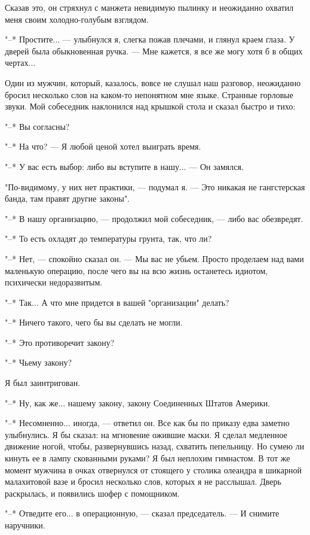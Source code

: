 Сказав это, он  стряхнул  с  манжета  невидимую  пылинку  и  неожиданно
охватил меня своим холодно-голубым взглядом.

"--* Простите... --- улыбнулся я,  слегка  пожав  плечами,  и  глянул  краем
глаза. У дверей была обыкновенная ручка. --- Мне кажется, я все же могу хотя
б в общих чертах...

Один из мужчин,  который,  казалось,  вовсе  не  слушал  наш  разговор,
неожиданно  бросил  несколько  слов  на  каком-то  непонятном  мне  языке.
Странные горловые звуки. Мой собеседник наклонился  над  крышкой  стола  и
сказал быстро и тихо:

"--* Вы согласны?

"--* На что? --- Я любой ценой хотел выиграть время.

"--* У вас есть выбор: либо вы вступите в нашу... --- Он замялся.

"По-видимому, у них нет  практики,  ---  подумал  я.  ---  Это  никакая  не
гангстерская банда, там правят другие законы".

"--*  В  нашу  организацию,  ---  продолжил  мой  собеседник,  ---  либо   вас
обезвредят.

"--* То есть охладят до температуры грунта, так, что ли?

"--* Нет, --- спокойно сказал он. --- Мы вас не убьем.  Просто  проделаем  над
вами маленькую операцию, после чего вы на всю  жизнь  останетесь  идиотом,
психически недоразвитым.

"--* Так... А что мне придется в вашей "организации" делать?

"--* Ничего такого, чего бы вы сделать не могли.

"--* Это противоречит закону?

"--* Чьему закону?

Я был заинтригован.

"--* Ну, как же... нашему закону, закону Соединенных Штатов Америки.

"--* Несомненно... иногда, --- ответил  он.  Все  как  бы  по  приказу  едва
заметно улыбнулись. Я бы сказал: на  мгновение  ожившие  маски.  Я  сделал
медленное движение ногой, чтобы, развернувшись назад, схватить пепельницу.
Но сумею ли кинуть ее в лампу скованными руками? Я был неплохим гимнастом.
В тот же момент мужчина в очках отвернулся от стоящего у столика  олеандра
в шикарной  малахитовой  вазе  и  бросил  несколько  слов,  которых  я  не
расслышал. Дверь раскрылась, и появились шофер с помощником.

"--* Отведите его... в операционную, --- сказал председатель.  ---  И  снимите
наручники.

